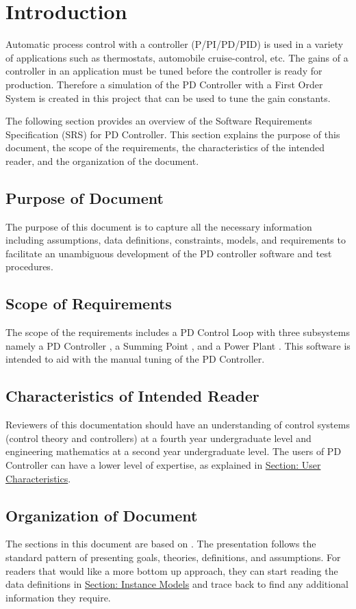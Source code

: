 \documentclass[12pt]{article}
\begin{document}
\section{Introduction}
\label{Sec:Intro}
Automatic process control with a controller (P/PI/PD/PID) is used  in a variety of applications such as thermostats, automobile  cruise-control, etc. The gains of a controller in an application  must be tuned before the controller is ready for production. Therefore a simulation of the  PD Controller  with a  First Order System is created in this project that can be  used to tune the gain constants.

The following section provides an overview of the Software Requirements Specification (SRS) for PD Controller. This section explains the purpose of this document, the scope of the requirements, the characteristics of the intended reader, and the organization of the document.

\subsection{Purpose of Document}
\label{Sec:DocPurpose}
The purpose of this document is to capture all the necessary  information including assumptions, data definitions, constraints,  models, and requirements to facilitate an unambiguous development  of the PD controller software and test procedures.

\subsection{Scope of Requirements}
\label{Sec:ReqsScope}
The scope of the requirements includes a PD Control Loop  with three subsystems namely a  PD Controller , a Summing Point , and a Power Plant . This  software is intended to aid with the manual tuning of the PD Controller.

\subsection{Characteristics of Intended Reader}
\label{Sec:ReaderChars}
Reviewers of this documentation should have an understanding of control systems (control theory and controllers) at a fourth year undergraduate level and engineering mathematics at a second year undergraduate level. The users of PD Controller can have a lower level of expertise, as explained in \hyperref[Sec:UserChars]{Section: User Characteristics}.

\subsection{Organization of Document}
\label{Sec:DocOrg}
The sections in this document are based on  \cite{smithLai2005}. The presentation follows the standard pattern of presenting goals, theories, definitions, and assumptions. For readers that would like a more bottom up approach, they can start reading the data definitions in \hyperref[Sec:IMs]{Section: Instance Models} and trace back to find any additional information they require.
\end{document}
